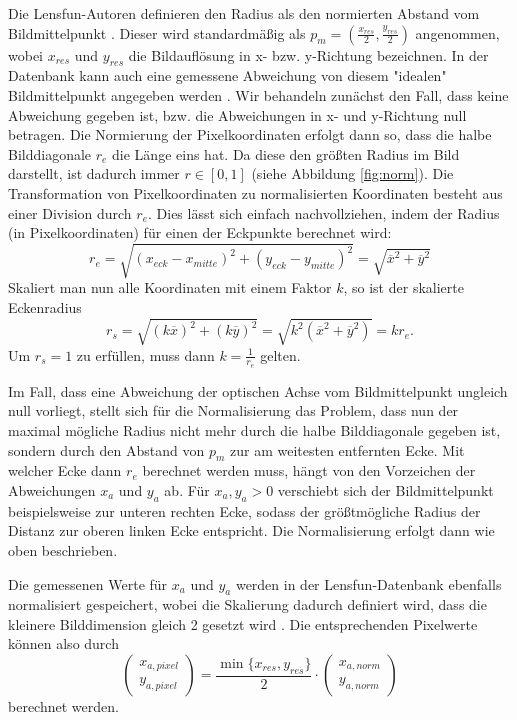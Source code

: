 Die Lensfun-Autoren definieren den Radius als den normierten Abstand vom Bildmittelpunkt \cite{lensfun, imatest}. Dieser wird standardmäßig als $p_m = (\frac{x_{res}}{2}, \frac{y_{res}}{2})$ angenommen, wobei $x_{res}$ und $y_{res}$ die Bildauflösung in x- bzw. y-Richtung bezeichnen. In der Datenbank kann auch eine gemessene Abweichung von diesem "idealen" Bildmittelpunkt angegeben werden \cite{lensfun_lensformat}. Wir behandeln zunächst den Fall, dass keine Abweichung gegeben ist, bzw. die Abweichungen in x- und y-Richtung null betragen. Die Normierung der Pixelkoordinaten erfolgt dann so, dass die halbe Bilddiagonale $r_e$ die Länge eins hat. Da diese den größten Radius im Bild darstellt, ist dadurch immer $r \in [0,1]$ (siehe Abbildung \ref{fig:norm}).
Die Transformation von Pixelkoordinaten zu normalisierten Koordinaten besteht aus einer Division durch $r_e$. Dies lässt sich einfach nachvollziehen, indem der Radius (in Pixelkoordinaten) für einen der Eckpunkte berechnet wird:
\begin{equation}
	r_e = \sqrt{(x_{eck} - x_{mitte})^2 + (y_{eck} - y_{mitte})^2} = \sqrt{\overline{x}^2 + \overline{y}^2}
\end{equation}
Skaliert man nun alle Koordinaten mit einem Faktor $k$, so ist der skalierte Eckenradius
\begin{equation}
	r_s = \sqrt{(k \overline{x})^2 + (k \overline{y})^2} = \sqrt{k^2 (\overline{x}^2 + \overline{y}^2)} = k r_e.
\end{equation}
Um $r_s = 1$ zu erfüllen, muss dann $k = \frac{1}{r_e}$ gelten.

Im Fall, dass eine Abweichung der optischen Achse vom Bildmittelpunkt ungleich null vorliegt, stellt sich für die Normalisierung das Problem, dass nun der maximal mögliche Radius nicht mehr durch die halbe Bilddiagonale gegeben ist, sondern durch den Abstand von $p_m$ zur am weitesten entfernten Ecke. Mit welcher Ecke dann $r_e$ berechnet werden muss, hängt von den Vorzeichen der Abweichungen $x_{a}$ und $y_{a}$ ab. Für $x_a, y_a > 0$ verschiebt sich der Bildmittelpunkt beispielsweise zur unteren rechten Ecke, sodass der größtmögliche Radius der Distanz zur oberen linken Ecke entspricht. Die Normalisierung erfolgt dann wie oben beschrieben.

Die gemessenen Werte für $x_{a}$ und $y_{a}$ werden in der Lensfun-Datenbank ebenfalls normalisiert gespeichert, wobei die Skalierung dadurch definiert wird, dass die kleinere Bilddimension gleich 2 gesetzt wird \cite{lensfun_lensformat}. Die entsprechenden Pixelwerte können also durch
\begin{equation}
\begin{pmatrix}
x_{a,pixel} \\ y_{a,pixel}
\end{pmatrix}
 = \frac{\min\{x_{res}, y_{res}\}}{2} \cdot
 \begin{pmatrix}
 x_{a,norm} \\ y_{a,norm}
 \end{pmatrix}
\end{equation} 
berechnet werden.

